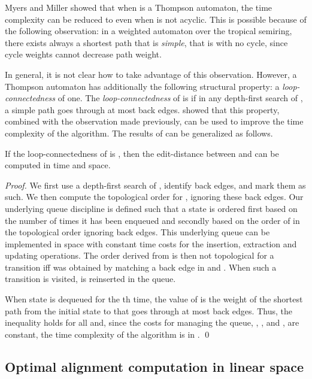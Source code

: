\documentclass{llncs}
\newcommand{\0}{\overline{0}}
\newcommand{\1}{\overline{1}}
\newcommand{\+}{\oplus}
\renewcommand{\.}{\otimes}
\begin{document}
Myers and Miller \cite{myers-miller89} showed that when  is a
Thompson automaton, the time complexity can be reduced to 
even when  is not acyclic.  This is possible because of the
following observation: in a weighted automaton over the tropical
semiring, there exists always a shortest path that is \emph{simple},
that is with no cycle, since cycle weights cannot decrease 
path weight.

In general, it is not clear how to take advantage of this
observation. However, a Thompson automaton has additionally the
following structural property: a \emph{loop-connectedness} of one.
The \emph{loop-connectedness} of  is  if in any depth-first
search of , a simple path goes through at most  back
edges. \cite{myers-miller89} showed that this property, combined with
the observation made previously, can be used to improve the time
complexity of the algorithm.  The results of \cite{myers-miller89} can
be generalized as follows.

\begin{corollary}
  If the loop-connectedness of  is , then the edit-distance
  between  and  can be computed in  time and
   space.
\end{corollary}
\begin{proof}
  We first use a depth-first search of , identify back edges, and
  mark them as such. We then compute the topological order for ,
  ignoring these back edges.  Our underlying queue discipline 
  is defined such that a state  is ordered first based on
  the number of times it has been enqueued and secondly based on the
  order of  in the topological order ignoring back edges. This
  underlying queue can be implemented in  space with
  constant time costs for the insertion, extraction and updating
  operations. The order  derived from  is then not
  topological for a transition  iff  was obtained by matching a
  back edge in  and . When such a
  transition  is visited,  is reinserted in the queue.

  When state  is dequeued for the th time, the value of 
  is the weight of the shortest path from the initial state to 
  that goes through at most  back edges.  Thus, the inequality
   holds for all  and, since the costs for
  managing the queue, , , and
  , are constant, the time complexity of the algorithm
  is in .  \qed
\end{proof}


\subsection{Optimal alignment computation in linear space}
\end{document}
